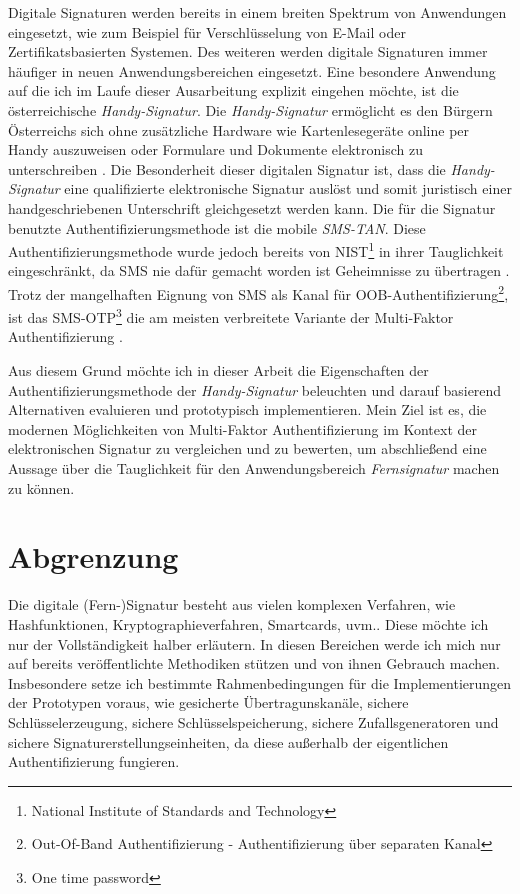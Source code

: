 \documentclass[11pt,a4paper,ngerman]{scrreprt}
\begin{document}
Digitale Signaturen werden bereits in einem breiten Spektrum von Anwendungen eingesetzt, wie zum Beispiel für Verschlüsselung von E-Mail oder Zertifikatsbasierten Systemen. Des weiteren werden digitale Signaturen immer häufiger in neuen Anwendungsbereichen eingesetzt. Eine besondere Anwendung auf die ich im Laufe dieser Ausarbeitung explizit eingehen möchte, ist die österreichische \textit{Handy-Signatur}. Die \textit{Handy-Signatur} ermöglicht es den Bürgern Österreichs sich ohne zusätzliche Hardware wie Kartenlesegeräte online per Handy auszuweisen oder Formulare und Dokumente elektronisch zu unterschreiben \cite{handySigOnline}. Die Besonderheit dieser digitalen Signatur ist, dass die \textit{Handy-Signatur} eine qualifizierte elektronische Signatur auslöst und somit juristisch einer handgeschriebenen Unterschrift gleichgesetzt werden kann. Die für die Signatur benutzte Authentifizierungsmethode ist die mobile \textit{SMS-TAN}. Diese Authentifizierungsmethode wurde jedoch bereits von NIST\footnote{National Institute of Standards and Technology} in ihrer Tauglichkeit eingeschränkt, da SMS nie dafür gemacht worden ist Geheimnisse zu übertragen \cite{mobileSec,NIST800-63B}. Trotz der mangelhaften Eignung von SMS als Kanal für OOB-Authentifizierung\footnote{Out-Of-Band Authentifizierung - Authentifizierung über separaten Kanal}, ist das SMS-OTP\footnote{One time password} die am meisten verbreitete Variante der Multi-Faktor Authentifizierung \cite[Abb. 3]{fido17}.

Aus diesem Grund möchte ich in dieser Arbeit die Eigenschaften der Authentifizierungsmethode der \textit{Handy-Signatur} beleuchten und darauf basierend Alternativen evaluieren und prototypisch implementieren. Mein Ziel ist es, die modernen Möglichkeiten von Multi-Faktor Authentifizierung im Kontext der elektronischen Signatur zu vergleichen und zu bewerten, um abschließend eine Aussage über die Tauglichkeit für den Anwendungsbereich \textit{Fernsignatur} machen zu können.

\section*{Abgrenzung}
Die digitale (Fern-)Signatur besteht aus vielen komplexen Verfahren, wie Hashfunktionen, Kryptographieverfahren, Smartcards, uvm.. Diese möchte ich nur der Vollständigkeit halber erläutern. In diesen Bereichen werde ich mich nur auf bereits veröffentlichte Methodiken stützen und von ihnen Gebrauch machen. Insbesondere setze ich bestimmte Rahmenbedingungen für die Implementierungen der Prototypen voraus, wie gesicherte Übertragunskanäle, sichere Schlüsselerzeugung, sichere Schlüsselspeicherung, sichere Zufallsgeneratoren und sichere Signaturerstellungseinheiten, da diese außerhalb der eigentlichen Authentifizierung fungieren.
\clearpage
\end{document}
